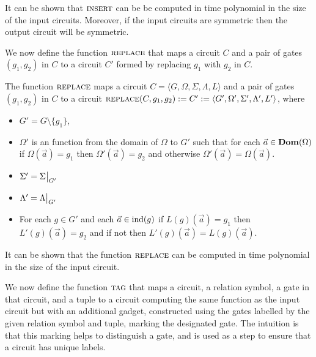 \documentclass[../paper.tex]{subfiles}
\begin{document}
It can be shown that ${\normalfont\textsc{insert}}$ can be be computed in time polynomial in the
size of the input circuits. Moreover, if the input circuits are symmetric then
the output circuit will be symmetric.

We now define the function ${\normalfont\textsc{replace}}$ that maps a circuit $C$ and a pair of
gates $(g_1, g_2)$ in $C$ to a circuit $C'$ formed by replacing $g_1$ with $g_2$
in $C$.

\begin{definition}
  The function ${\normalfont\textsc{replace}}$ maps a circuit $C = \langle G, \Omega, \Sigma,
  \Lambda, L\rangle$ and a pair of gates $(g_1, g_2)$ in $C$ to a circuit
  ${\normalfont\textsc{replace}}(C, g_1, g_2) := C' := \langle G', \Omega', \Sigma', \Lambda', L'
  \rangle$, where
  \begin{itemize}
    \setlength\itemsep{0mm}
  \item $G' = G \setminus \{g_1\}$,
  \item $\Omega'$ is an function from the domain of $\Omega$ to $G'$ such that
    for each $\vec{a} \in \text{\textbf{Dom}}(\Omega)$ if $\Omega(\vec{a}) = g_1$ then
    $\Omega'(\vec{a}) = g_2$ and otherwise $\Omega'(\vec{a}) = \Omega(\vec{a})$.
  \item $\Sigma' = \restr{\Sigma}{G'}$
  \item $\Lambda' = \restr{\Lambda}{G'}$
  \item For each $g \in G'$ and each $\vec{a} \in \text{\upshape ind}(g)$ if $L(g)(\vec{a}) =
    g_1$ then $L'(g)(\vec{a}) = g_2$ and if not then $L'(g)(\vec{a}) =
    L(g)(\vec{a})$.
  \end{itemize}
\end{definition}

It can be shown that the function ${\normalfont\textsc{replace}}$ can be computed in time
polynomial in the size of the input circuit.

We now define the function ${\normalfont\textsc{tag}}$ that maps a circuit, a relation symbol, a
gate in that circuit, and a tuple to a circuit computing the same function as
the input circuit but with an additional gadget, constructed using the gates
labelled by the given relation symbol and tuple, marking the designated gate.
The intuition is that this marking helps to distinguish a gate, and is used as a
step to ensure that a circuit has unique labels.
\end{document}
